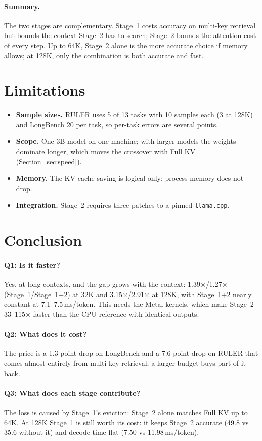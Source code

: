 \documentclass[10pt,letterpaper]{article}
\newcommand{\code}[1]{\texttt{#1}}
\begin{document}
\FloatBarrier
\paragraph{Summary.}
The two stages are complementary. Stage~1 costs accuracy on multi-key retrieval but bounds the context Stage~2 has to search; Stage~2 bounds the attention cost of every step. Up to 64K, Stage~2 alone is the more accurate choice if memory allows; at 128K, only the combination is both accurate and fast.

\section{Limitations}
\begin{itemize}
\item \textbf{Sample sizes.} RULER uses 5 of 13 tasks with 10 samples each (3 at 128K) and LongBench 20 per task, so per-task errors are several points.
\item \textbf{Scope.} One 3B model on one machine; with larger models the weights dominate longer, which moves the crossover with Full KV (Section~\ref{sec:speed}).
\item \textbf{Memory.} The KV-cache saving is logical only; process memory does not drop.
\item \textbf{Integration.} Stage~2 requires three patches to a pinned \code{llama.cpp}.
\end{itemize}

\section{Conclusion}
\paragraph{Q1: Is it faster?} Yes, at long contexts, and the gap grows with the context: 1.39$\times$/1.27$\times$ (Stage~1/Stage~1+2) at 32K and 3.15$\times$/2.91$\times$ at 128K, with Stage~1+2 nearly constant at 7.1--7.5\,ms/token. This needs the Metal kernels, which make Stage~2 33--115$\times$ faster than the CPU reference with identical outputs.

\paragraph{Q2: What does it cost?} The price is a 1.3-point drop on LongBench and a 7.6-point drop on RULER that comes almost entirely from multi-key retrieval; a larger budget buys part of it back.

\paragraph{Q3: What does each stage contribute?} The loss is caused by Stage~1's eviction: Stage~2 alone matches Full KV up to 64K. At 128K Stage~1 is still worth its cost: it keeps Stage~2 accurate (49.8 vs 35.6 without it) and decode time flat (7.50 vs 11.98\,ms/token).
\end{document}
